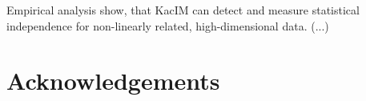 \documentclass{article}
\begin{document}
Empirical analysis show, that KacIM can detect and measure statistical independence for non-linearly related, high-dimensional data. (...)

\section{Acknowledgements}




%


{\footnotesize
}


\end{document}

